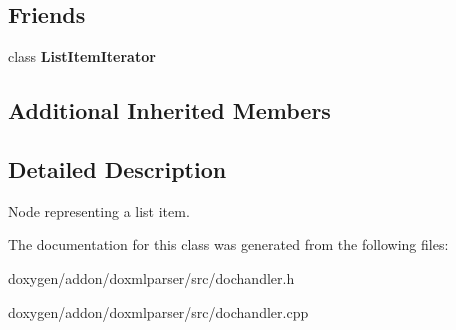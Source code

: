 \subsection*{Friends}
\begin{DoxyCompactItemize}
\item 
\mbox{\label{class_list_item_handler_a3a88ab28cd536f79e87cabca42245259}} 
class {\bfseries List\+Item\+Iterator}
\end{DoxyCompactItemize}
\subsection*{Additional Inherited Members}


\subsection{Detailed Description}
Node representing a list item. 



The documentation for this class was generated from the following files\+:\begin{DoxyCompactItemize}
\item 
doxygen/addon/doxmlparser/src/dochandler.\+h\item 
doxygen/addon/doxmlparser/src/dochandler.\+cpp\end{DoxyCompactItemize}
